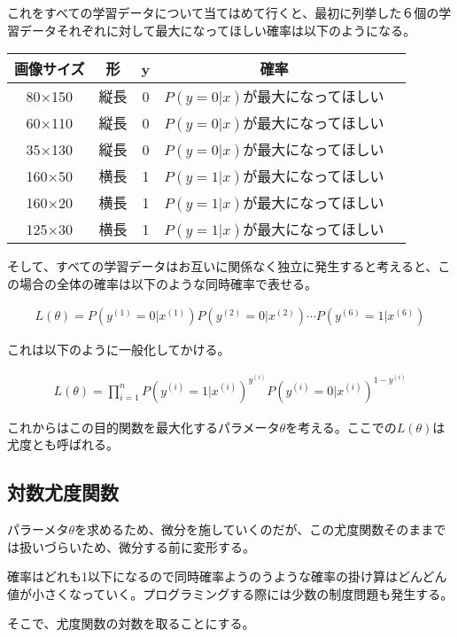 \documentclass{jsarticle}
\begin{document}
これをすべての学習データについて当てはめて行くと、最初に列挙した６個の学習データそれぞれに対して最大になってほしい確率は以下のようになる。

\begin{table}[htb]
  \begin{tabular}{|c|c|c|c|c|} \hline
    画像サイズ & 形 & y & 確率 \\ \hline
    80×150 & 縦長 & 0 & $P(y=0|x)$が最大になってほしい \\ \hline
    60×110 & 縦長 & 0 & $P(y=0|x)$が最大になってほしい \\ \hline
    35×130 & 縦長 & 0 & $P(y=0|x)$が最大になってほしい \\ \hline
    160×50 & 横長 & 1 & $P(y=1|x)$が最大になってほしい \\ \hline
    160×20 & 横長 & 1 & $P(y=1|x)$が最大になってほしい \\ \hline
    125×30 & 横長 & 1 & $P(y=1|x)$が最大になってほしい \\ \hline
  \end{tabular}
\end{table}

そして、すべての学習データはお互いに関係なく独立に発生すると考えると、この場合の全体の確率は以下のような同時確率で表せる。

\begin{align}
	L(\theta) = P(y^{(1)} =0|x^{(1)}) P(y^{(2)} =0|x^{(2)}) \cdots P(y^{(6)} =1|x^{(6)})
\end{align}

これは以下のように一般化してかける。

\begin{align}
	L(\theta) =\prod_{i=1}^{n} P(y^{(i)} = 1|x^{(i)})^{y^{(i)}} P(y^{(i)} = 0|x^{(i)})^{1-y^{(i)}}
\end{align}

これからはこの目的関数を最大化するパラメータ$\theta$を考える。ここでの$L(\theta)$は尤度とも呼ばれる。

\subsection{対数尤度関数}
パラーメタ$\theta$を求めるため、微分を施していくのだが、この尤度関数そのままでは扱いづらいため、微分する前に変形する。

確率はどれも1以下になるので同時確率ようのうような確率の掛け算はどんどん値が小さくなっていく。プログラミングする際には少数の制度問題も発生する。

そこで、尤度関数の対数を取ることにする。
\end{document}
